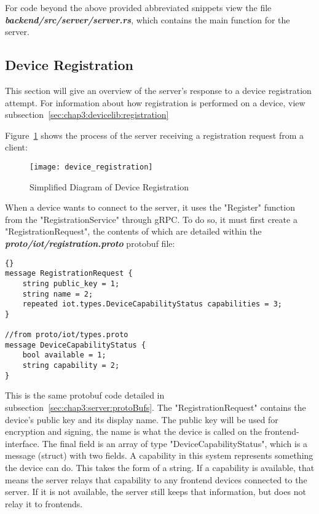 For code beyond the above provided abbreviated snippets view the file \textbf{\textit{backend/src/server/server.rs}}, which contains the main function for the server.

\subsection{Device Registration} \label{sec:chap3:server:registration} 
This section will give an overview of the server's response to a device registration attempt. For information about how registration is performed on a device, view subsection~\ref{sec:chap3:devicelib:registration}

Figure~\ref{fig:server_registration} shows the process of the server receiving a registration request from a client:

\begin{figure}[h]
\caption{Simplified Diagram of Device Registration}
\texttt{[image: device\_registration]}
\label{fig:server_registration}
\end{figure}
When a device wants to connect to the server, it uses the "Register" function from the "RegistrationService" through gRPC. To do so, it must first create a "RegistrationRequest", the contents of which are detailed within the \textit{\textbf{proto/iot/registration.proto}} protobuf file:
\pagebreak
\begin{lstlisting}[language=protobuf3, style=boxed, showstringspaces=false]{}
message RegistrationRequest {
    string public_key = 1;
    string name = 2;
    repeated iot.types.DeviceCapabilityStatus capabilities = 3;
}

//from proto/iot/types.proto
message DeviceCapabilityStatus {
    bool available = 1;
    string capability = 2;
}
\end{lstlisting}
This is the same protobuf code detailed in subsection~\ref{sec:chap3:server:protoBufs}. The "RegistrationRequest" contains the device's public key and its display name. The public key will be used for encryption and signing, the name is what the device is called on the frontend-interface. The final field is an array of type "DeviceCapabilityStatus", which is a message (struct) with two fields. A capability in this system represents something the device can do. This takes the form of a string. If a capability is available, that means the server relays that capability to any frontend devices connected to the server. If it is not available, the server still keeps that information, but does not relay it to frontends. 

